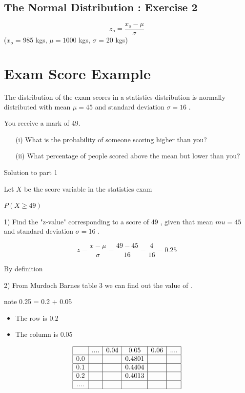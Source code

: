 \documentclass[]{report}
\begin{document}
	
	
	\subsection{The Normal Distribution :  Exercise 2}
	
	\[ z_o = \frac{x_o - \mu}{\sigma}  \]
	($x_o$ = 985 kgs, $\mu = 1000$ kgs, $\sigma$ = 20 kgs)
	
	
	
	
	
	
	
	
	
	\newpage
	\section{Exam Score Example}
	The distribution of the exam scores in a statistics distribution is normally distributed with mean $\mu=45$  and standard deviation 
	$\sigma=16$
	.
	
	You receive a mark of 49.
	\begin{itemize}
		\item[(i)]
		What is the probability of someone scoring higher than you?
		
		\item[(ii)] What percentage of people scored above the mean but lower than you?
	\end{itemize}
	Solution to part 1
	
	Let $X$ be the score variable in the statistics exam
	
	$P(X \geq 49)$ 
	
	1) Find the  "z-value" corresponding to a score of 49 , given that mean $mu=45$   and standard deviation  $\sigma=16$ .
	
	\[ z  = \frac{x-\mu}{\sigma}   = \frac{49-45}{16}  = \frac{4}{16} =0.25\]
	
	By definition  
	
	2) From Murdoch Barnes table 3 we can find out the value of   . 
	
	note  0.25 = 0.2 + 0.05
	
	\begin{itemize}
		\item    The row is 0.2
		\item    The column is 0.05
	\end{itemize}
	\[
	\begin{array}{|c|c|c|c|c|c|c|}\hline
	& ....	& 0.04	& 0.05	 & 0.06	& .... \\ \hline
	0.0	&	&	& 0.4801 & 	& 	\\ \hline
	0.1	&	&	& 0.4404 &	& 	\\ \hline
	0.2	&	&	& 0.4013 &	& 	\\ \hline
	....	&	&	&	 & 	&	\\ \hline
	
	\end{array} \]
	
\end{document}
